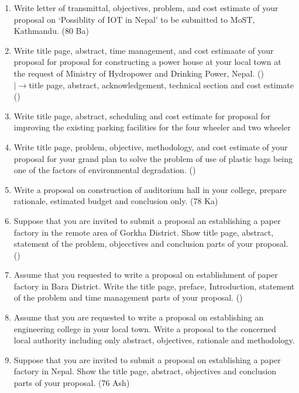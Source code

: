 \documentclass[12pt]{article}
\newcommand{\lb}{\\$\left|\rightarrow\right.$}
\begin{document}
\begin{enumerate}
    \item Write letter of transmittal, objectives, problem, and cost estimate of your proposal on `Possiblity of IOT in Nepal' to be submitted to MoST, Kathmandu. \hfill (80 Ba)

    \item Write title page, abstract, time management, and cost estimaate of your proposal for proposal for constructing a power house at your local town at the request of Ministry of Hydropower and Drinking Power, Nepal. \hfill ()
      \lb title page, abstract, acknowledgement, technical section and cost estimate \hfill ()

    \item Write title page, abstract, scheduling and cost estimate for proposal for improving the existing parking facilities for the four wheeler and two wheeler

    \item Write title page, problem, objective, methodology, and cost estimate of your proposal for your grand plan to solve the problem of use of plastic bags being one of the factors of environmental degradation. \hfill ()

    \item Write a proposal on construction of auditorium hall in your college, prepare rationale, estimated budget and conclusion only. \hfill (78 Ka)
      
    \item Suppose that you are invited to submit a proposal an establishing a paper factory in the remote area of Gorkha District. Show title page, abstract, statement of the problem, objecctives and conclusion parts of your proposal. \hfill ()

    \item Assume that you requested to write a proposal on establishment of paper factory in Bara District. Write the title page, preface, Introduction, statement of the problem and time management parts of your proposal. \hfill ()

    \item Assume that you are requested to write a proposal on establishing an engineering college in your local town. Write a proposal to the concerned local authority including only abstract, objectives, rationale and methodology. \hfill {}

    \item Suppose that you are invited to submit a proposal on establishing a paper factory in Nepal. Show the title page, abstract, objectives and conclusion parts of your proposal. \hfill (76 Ash)
  \end{enumerate}
\end{document}

